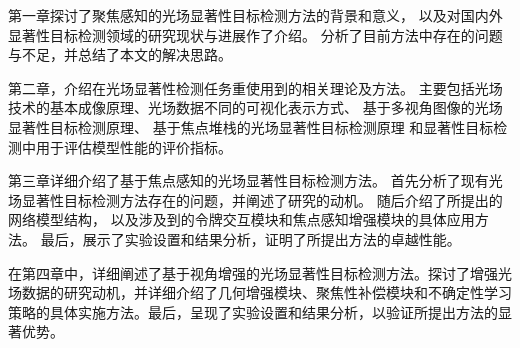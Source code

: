 

第一章探讨了聚焦感知的光场显著性目标检测方法的背景和意义，
以及对国内外显著性目标检测领域的研究现状与进展作了介绍。
分析了目前方法中存在的问题与不足，并总结了本文的解决思路。


第二章，介绍在光场显著性检测任务重使用到的相关理论及方法。
主要包括光场技术的基本成像原理、光场数据不同的可视化表示方式、
基于多视角图像的光场显著性目标检测原理、
基于焦点堆栈的光场显著性目标检测原理
和显著性目标检测中用于评估模型性能的评价指标。


第三章详细介绍了基于焦点感知的光场显著性目标检测方法。
首先分析了现有光场显著性目标检测方法存在的问题，并阐述了研究的动机。
随后介绍了所提出的网络模型结构，
以及涉及到的令牌交互模块和焦点感知增强模块的具体应用方法。
最后，展示了实验设置和结果分析，证明了所提出方法的卓越性能。


在第四章中，详细阐述了基于视角增强的光场显著性目标检测方法。探讨了增强光场数据的研究动机，并详细介绍了几何增强模块、聚焦性补偿模块和不确定性学习策略的具体实施方法。最后，呈现了实验设置和结果分析，以验证所提出方法的显著优势。































